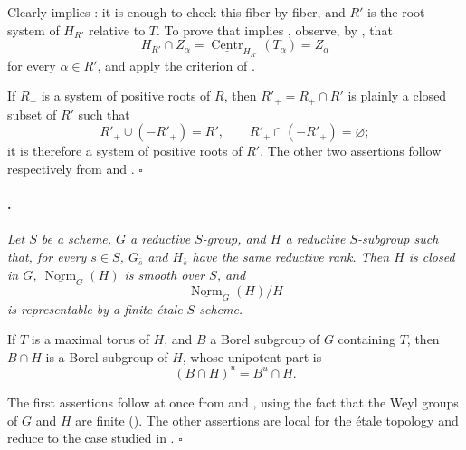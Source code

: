 Clearly \textup{} implies \textup{}: it is enough to check
this fiber by fiber, and \(R'\) is the root system of \(H_{R'}\)
relative to \(T\). To prove that \textup{} implies
\textup{}, observe, by , that
\[
  H_{R'}\cap Z_\alpha
  =
  \underline{\operatorname{Centr}}_{H_{R'}}(T_\alpha)
  =
  Z_\alpha
\]
for every \(\alpha\in R'\), and apply the criterion of .

If \(R_+\) is a system of positive roots of \(R\), then
\(R'_+=R_+\cap R'\) is plainly a closed subset of \(R'\) such that
\[
  R'_+\cup(-R'_+)=R',
  \qquad
  R'_+\cap(-R'_+)=\varnothing;
\]
it is therefore a system of positive roots of \(R'\). The other two
assertions follow respectively from \textup{} and
\textup{}.
\hfill\(\square\)

\paragraph{.}
{\itshape Let \(S\) be a scheme, \(G\) a reductive \(S\)-group,
and \(H\) a reductive \(S\)-subgroup such that, for every
\(s\in S\), \(G_{\bar s}\) and \(H_{\bar s}\) have the same
reductive rank. Then \(H\) is closed in \(G\),
\(\underline{\operatorname{Norm}}_G(H)\) is smooth over \(S\), and
\[
  \underline{\operatorname{Norm}}_G(H)/H
\]
is representable by a finite étale \(S\)-scheme.

If \(T\) is a maximal torus of \(H\), and \(B\) a Borel subgroup of
\(G\) containing \(T\), then \(B\cap H\) is a Borel subgroup of
\(H\), whose unipotent part is
\[
  (B\cap H)^u=B^u\cap H.
\]}

The first assertions follow at once from  and , using
the fact that the Weyl groups of \(G\) and \(H\) are finite
\textup{()}. The other assertions are local for the
étale topology and reduce to the case studied in .
\hfill\(\square\)

